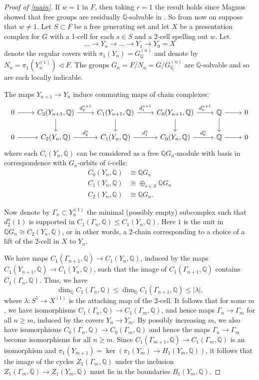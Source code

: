 \documentclass{amsart}
\theoremstyle{definition}
\newcommand{\Q}{\mathbb{Q}}
\newcommand{\isom}{\cong}
\begin{document}
\begin{proof}[Proof of \cref{main}]
If $w = 1$ in $F$, then taking $r = 1$ the result holds since Magnus showed that free groups are residually $\Q$-solvable in \cite{Ma35}. So from now on suppose that $w\neq 1$. Let $S\subset F$ be a free generating set and let $X$ be a presentation complex for $G$ with a 1-cell for each $s\in S$ and a 2-cell spelling out $w$. Let 
\[
\ldots \to Y_n\to \ldots \to Y_1 \to Y_0 = X
\]
denote the regular covers with $\pi_1(Y_n) = G_{\Q}^{(n)}$ and denote by $N_n = \pi_1\left(Y_n^{(1)}\right)\triangleleft F$. The groups $G_n = F/N_n = G/G_{\Q}^{(n)}$ are $\Q$-solvable and so are each locally indicable. 

The maps $Y_{n+1}\to Y_{n}$ induce commuting maps of chain complexes:
\[
    \begin{tikzcd}
    0 \arrow[r] &C_2(Y_{n+1}, \Q) \arrow[r, "d_2^{n+1}"] \arrow[d] & C_1(Y_{n+1}, \Q) \arrow[r, "d_1^{n+1}"] \arrow[d] & C_0(Y_{n+1}, \Q) \arrow[r, "d_0^{n+1}"] \arrow[d] & \Q \arrow[r] \arrow[d] & 0 \\
    0 \arrow[r] & C_2(Y_{n}, \Q) \arrow[r, "d_2^{n}"] & C_1(Y_{n}, \Q) \arrow[r, "d_1^{n}"] & C_0(Y_{n}, \Q) \arrow[r, "d_0^{n}"] & \Q \arrow[r] & 0
    \end{tikzcd}
    \]
where each $C_i(Y_n, \Q)$ can be considered as a free $\Q G_n$-module with basis in correspondence with $G_n$-orbits of $i$-cells:
\begin{align*}
C_0(Y_n, \Q) &\isom \Q G_n\\
C_1(Y_n, \Q) &\isom \oplus_{s\in S}\Q G_n\\
C_2(Y_n, \Q) &\isom \Q G_n.
\end{align*}

Now denote by $\Gamma_n\subset Y_n^{(1)}$ the minimal (possibly empty) subcomplex such that $d^n_2(1)$ is supported in $C_1(\Gamma_n, \Q)\leqslant C_1(Y_n, \Q)$. Here $1$ is the unit in $\Q G_n \isom C_2(Y_n, \Q)$, or in other words, a 2-chain corresponding to a choice of a lift of the 2-cell in $X$ to $Y_n$. 

We have maps $C_1(\Gamma_{n+1}, \Q)\to C_1(Y_{n}, \Q)$, induced by the maps $C_1(Y_{n+1}, \Q)\to C_1(Y_{n}, \Q)$, such that the image of $C_1(\Gamma_{n+1}, \Q)$ contains $C_1(\Gamma_{n}, \Q)$. Thus, we have
\[
\dim_{\Q}C_1(\Gamma_{n}, \Q)\leqslant \dim_{\Q}C_1(\Gamma_{n+1}, \Q)\leqslant |\lambda|.
\]
where $\lambda\colon S^1\to X^{(1)}$ is the attaching map of the 2-cell. It follows that for some $m$, we have isomorphisms $C_1(\Gamma_n, \Q)\to C_1(\Gamma_m, \Q)$, and hence maps $\Gamma_n\to\Gamma_m$ for all $n\geqslant m$, induced by the covers $Y_n\to Y_m$. By possibly increasing $m$, we also have isomorphisms $C_0(\Gamma_n, \Q)\to C_0(\Gamma_m, \Q)$ and hence the maps $\Gamma_n\to \Gamma_m$ become isomorphisms for all $n\geqslant m$. Since $C_1(\Gamma_{m+1}, \Q)\to C_1(\Gamma_m, \Q)$ is an isomorphism and $\pi_1(Y_{m+1}) = \ker(\pi_1(Y_m)\to H_1(Y_m, \Q))$, it follows that the image of the cycles $Z_1(\Gamma_m, \Q)$ under the inclusion $Z_1(\Gamma_m, \Q)\to Z_1(Y_m, \Q)$ must lie in the boundaries $B_1(Y_m, \Q)$. 


\end{proof}
\end{document}

